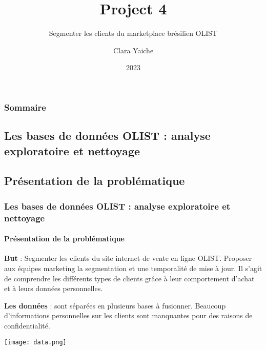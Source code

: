 \documentclass{beamer}
\title{Project 4 }
\subtitle{Segmenter les clients du marketplace brésilien OLIST}
\author{Clara Yaiche}
\institute{OpenClassroom}
\date{2023}
\begin{document}
\frame{\titlepage}


\begin{frame}
	\frametitle{Sommaire} %
	
	\tableofcontents %
\end{frame}
\begin{frame}

\section{Les bases de données OLIST : analyse exploratoire et nettoyage}
\subsection{Présentation de la problématique}

\frametitle{Les bases de données OLIST : analyse exploratoire et nettoyage}
\framesubtitle{Présentation de la problématique}
\textbf{But} : Segmenter les clients du site internet de vente en ligne  OLIST. Proposer aux équipes marketing la segmentation et une temporalité de mise à jour. Il s'agit de comprendre les différents types de clients grâce à leur comportement d'achat et à leurs données personnelles. \newline

\textbf{Les données} : sont séparées en plusieurs bases à fusionner. Beaucoup d'informations personnelles sur les clients sont manquantes pour des raisons de confidentialité.  \\

\begin{center}
    \texttt{[image: data.png]}
\end{center}



\end{frame}


\end{document}
